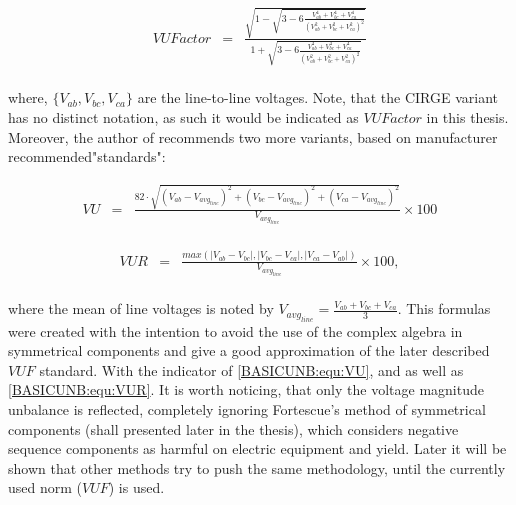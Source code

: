 	\begin{equation}
        \begin{array}{rcl}
            VUFactor&=&\frac{\sqrt{{1-\sqrt{3-6\frac{V_{ab}^4+V_{bc}^4+V_{ca}^4}{\left(V_{ab}^2+V_{bc}^2+V_{ca}^2\right)^2}}}}}{1+\sqrt{3-6\frac{V_{ab}^4+V_{bc}^4+V_{ca}^4}{\left(V_{ab}^2+V_{bc}^2+V_{ca}^2\right)^2}}}\\
        \end{array}
        \label{BASICUNB:equ:CIRGE}
    \end{equation}
		
		where, $\{V_{ab},V_{bc},V_{ca}\}$ are the line-to-line voltages. Note, that the CIRGE variant has no distinct notation, as such it would be indicated as $VUFactor$ in this thesis. Moreover, the author of \cite{robert1992assessing} recommends two more variants, based on manufacturer recommended"standards":
		
		\begin{equation}
        \begin{array}{rcl}
            VU&=&\frac{82\cdot\sqrt{(V_{ab}-V_{avg_{line}})^2+(V_{bc}-V_{avg_{line}})^2+(V_{ca}-V_{avg_{line}})^2}}{V_{avg_{line}}}\times100\\					
        \end{array}
        \label{BASICUNB:equ:VU}
    \end{equation}
		
		\begin{equation}
        \begin{array}{rcl}
            VUR&=&\frac{max\left( |V_{ab}-V_{bc}|,|V_{bc}-V_{ca}|,|V_{ca}-V_{ab}| \right)}{V_{avg_{line}}}\times100,\\				
        \end{array}
        \label{BASICUNB:equ:VUR}
    \end{equation}
		
		where the mean of line voltages is noted by $V_{avg_{line}}=\frac{V_{ab}+V_{bc}+V_{ca}}{3}$.
		This formulas were created with the intention to avoid the use of the complex algebra in symmetrical components and give
a good approximation of the later described $VUF$ standard. With the indicator of \ref{BASICUNB:equ:VU}, and as well as \ref{BASICUNB:equ:VUR}. It is worth noticing, that only the voltage magnitude unbalance is reflected, completely ignoring Fortescue's method of symmetrical components \cite{fortescue1918method} (shall presented later in the thesis), which considers negative sequence components as harmful on electric equipment and yield. Later it will be shown that other methods try to push the same methodology, until the currently used norm ($VUF$) is used.

